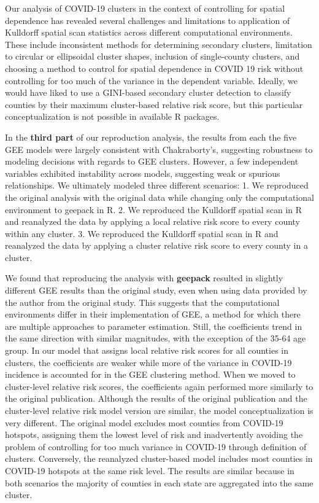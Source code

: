 \documentclass[
]{article}
\begin{document}
Our analysis of COVID-19 clusters in the context of controlling for
spatial dependence has revealed several challenges and limitations to
application of Kulldorff spatial scan statistics across different
computational environments. These include inconsistent methods for
determining secondary clusters, limitation to circular or ellipsoidal
cluster shapes, inclusion of single-county clusters, and choosing a
method to control for spatial dependence in COVID 19 risk without
controlling for too much of the variance in the dependent variable.
Ideally, we would have liked to use a GINI-based secondary cluster
detection to classify counties by their maximum cluster-based relative
risk score, but this particular conceptualization is not possible in
available R packages.

In the \textbf{third part} of our reproduction analysis, the results
from each the five GEE models were largely consistent with
Chakraborty's, suggesting robustness to modeling decisions with regards
to GEE clusters. However, a few independent variables exhibited
instability across models, suggesting weak or spurious relationships. We
ultimately modeled three different scenarios: 1. We reproduced the
original analysis with the original data while changing only the
computational environment to geepack in R. 2. We reproduced the
Kulldorff spatial scan in R and reanalyzed the data by applying a local
relative risk score to every county within any cluster. 3. We reproduced
the Kulldorff spatial scan in R and reanalyzed the data by applying a
cluster relative risk score to every county in a cluster.

We found that reproducing the analysis with \textbf{geepack} resulted in
slightly different GEE results than the original study, even when using
data provided by the author from the original study. This suggests that
the computational environments differ in their implementation of GEE, a
method for which there are multiple approaches to parameter estimation.
Still, the coefficients trend in the same direction with similar
magnitudes, with the exception of the 35-64 age group. In our model that
assigns local relative risk scores for all counties in clusters, the
coefficients are weaker while more of the variance in COVID-19 incidence
is accounted for in the GEE clustering method. When we moved to
cluster-level relative risk scores, the coefficients again performed
more similarly to the original publication. Although the results of the
original publication and the cluster-level relative risk model version
are similar, the model conceptualization is very different. The original
model excludes most counties from COVID-19 hotspots, assigning them the
lowest level of risk and inadvertently avoiding the problem of
controlling for too much variance in COVID-19 through definition of
clusters. Conversely, the reanalyzed cluster-based model includes most
counties in COVID-19 hotspots at the same risk level. The results are
similar because in both scenarios the majority of counties in each state
are aggregated into the same cluster.
\end{document}
